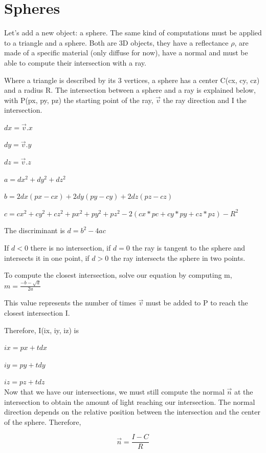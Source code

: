 \section{Spheres}
Let's add a new object: a sphere. The same kind of computations must be applied to a triangle and a sphere. Both are 3D objects, they have a reflectance $\rho$, are made of a specific material (only diffuse for now), have a normal and must be able to compute their intersection with a ray.

Where a triangle is described by its 3 vertices, a sphere has a center C(cx, cy, cz) and a radius R. The intersection between a sphere and a ray is explained below, with P(px, py, pz) the starting point of the ray, $\vec{v}$ the ray direction and I the intersection.

$dx = \vec{v}.x$

$dy = \vec{v}.y$

$dz = \vec{v}.z$

$a = dx^2 + dy^2 + dz^2$

$b = 2 dx (px - cx) + 2 dy (py - cy) + 2 dz (pz - cz)$

$c =  cx^2 + cy^2 + cz^2 + px^2 + py^2 + pz^2 - 2 (cx * pc + cy * py + cz * pz) - R^2$

The discriminant is $d = b^2 - 4 a c$

If $d < 0$ there is no intersection, if $d = 0$ the ray is tangent to the sphere and intersects it in one point, if $d > 0$ the ray intersects the sphere in two points.

To compute the closest intersection, solve our equation by computing m, $m = \frac{-b -\sqrt{d}}{2a}$

This value represents the number of times $\vec{v}$ must be added to P to reach the closest intersection I.

Therefore, I(ix, iy, iz) is

$ix = px + t dx$

$iy = py + t dy$

$iz = pz + t dz$\\


Now that we have our intersections, we must still compute the normal $\vec{n}$ at the intersection to obtain the amount of light reaching our intersection. The normal direction depends on the relative position between the intersection and the center of the sphere. Therefore,

\begin{equation}
\vec{n} = \frac{I - C}{R}
\end{equation}

